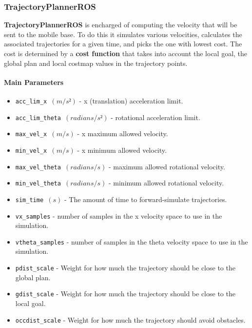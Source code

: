 \documentclass[12pt]{article}
\begin{document}
\subsubsection{TrajectoryPlannerROS }

\textbf{TrajectoryPlannerROS} is encharged of computing the velocity that will be sent to the mobile base. To do this it simulates various velocities, calculates the associated trajectories for a given time, and picks the one with lowest cost. The cost is determined by a \textbf{cost function} that takes into account the local goal, the global plan and local costmap values in the trajectory points.

\paragraph{Main Parameters \cite{localplanner}}
\begin{itemize}[label={}]
    \item \texttt{acc\_lim\_x $(m/s²)$} - x (translation) acceleration limit.
    \item \texttt{acc\_lim\_theta $(radians/s²)$} - rotational acceleration limit.
    \item \texttt{max\_vel\_x $(m/s)$} - x maximum allowed velocity.
    \item \texttt{min\_vel\_x $(m/s)$} - x minimum allowed velocity.
    \item \texttt{max\_vel\_theta $(radians/s)$} - maximum allowed rotational  velocity.
    \item \texttt{min\_vel\_theta $(radians/s)$} - minimum allowed rotational velocity.
    \item \texttt{sim\_time $(s)$} - The amount of time to forward-simulate trajectories.
    \item \texttt{vx\_samples} - number of samples in the x velocity space to use in the simulation.
    \item \texttt{vtheta\_samples} - number of samples in the theta velocity space to use in the simulation.
    \item \texttt{pdist\_scale} - Weight for how much the trajectory should be close to the global plan.
    \item \texttt{gdist\_scale} - Weight for how much the trajectory should be close to the local goal.
    \item \texttt{occdist\_scale} - Weight for how much the trajectory should avoid obstacles.
\end{itemize}
\end{document}
